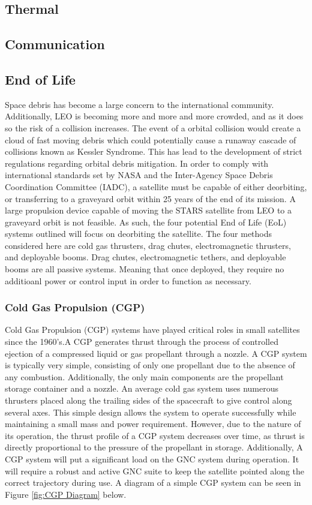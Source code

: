 \documentclass[3p]{elsarticle}
\begin{document}
\subsection{Thermal}

\subsection{Communication}

\subsection{End of Life}

Space debris has become a large concern to the international community. Additionally, LEO is becoming more and more and more crowded, and as it does so the risk of a collision increases. The event of a orbital collision would create a cloud of fast moving debris which could potentially cause a runaway cascade of collisions known as Kessler Syndrome.\cite{Kessler_Syndrome}  This has lead to the development of strict regulations regarding orbital debris mitigation. In order to comply with international standards set by NASA and the Inter-Agency Space Debris Coordination Committee (IADC), a satellite must be capable of either deorbiting, or transferring to a graveyard orbit within 25 years of the end of its mission.\cite{STD8719} A large propulsion device capable of moving the STARS satellite from LEO to a graveyard orbit is not feasible. As such, the four potential End of Life (EoL) systems outlined will focus on deorbiting the satellite. The four methods considered here are cold gas thrusters, drag chutes, electromagnetic thrusters, and deployable booms. Drag chutes, electromagnetic tethers, and deployable booms are all passive systems. Meaning that once deployed, they require no additioanl power or control input in order to function as necessary. 
\subsubsection{Cold Gas Propulsion (CGP)}

Cold Gas Propulsion (CGP) systems have played critical roles in small satellites since the 1960's.A CGP generates thrust through the process of controlled ejection of a compressed liquid or gas propellant through a nozzle. A CGP system is typically very simple, consisting of only one propellant due to the absence of any combustion. Additionally, the only main components are the propellant storage container and a nozzle. An average cold gas system uses numerous thrusters placed along the trailing sides of the spacecraft to give control along several axes. This simple design allows the system to operate successfully while maintaining a small mass and power requirement. However, due to the nature of its operation, the thrust profile of a CGP system decreases over time, as thrust is directly proportional to the pressure of the propellant in storage.\cite{Passive_Deorbit} Additionally, A CGP system will put a significant load on the GNC system during operation. It will require a robust and active GNC suite to keep the satellite pointed along the correct trajectory during use. A diagram of a simple CGP system can be seen in Figure \ref{fig:CGP Diagram} below.
\end{document}
